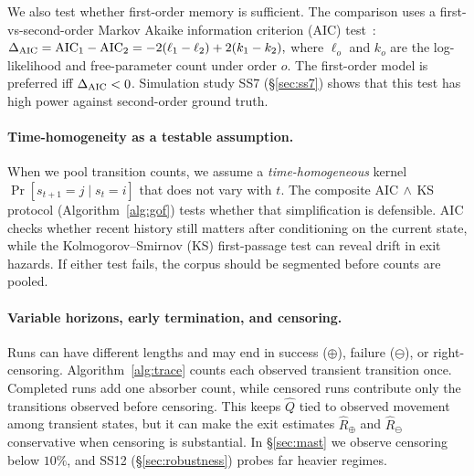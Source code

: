 We also test whether first-order memory is sufficient. The comparison
uses a first-vs-second-order Markov Akaike information criterion (AIC)
test~\cite{akaike1974}:
$\Delta_{\rm AIC} = \mathrm{AIC}_1 - \mathrm{AIC}_2
                  = -2(\ell_1 - \ell_2) + 2(k_1 - k_2),$
where $\ell_o$ and $k_o$ are the log-likelihood and free-parameter
count under order $o$. The first-order model is preferred iff
$\Delta_{\rm AIC} < 0$. Simulation study SS7 (\S\ref{sec:ss7}) shows
that this test has high power against second-order ground truth.

\paragraph{Time-homogeneity as a testable assumption.}
When we pool transition counts, we assume a \emph{time-homogeneous}
kernel $\Pr[s_{t+1}=j \mid s_t=i]$ that does not vary with $t$. The
composite AIC$\,\wedge\,$KS protocol (Algorithm~\ref{alg:gof}) tests
whether that simplification is defensible. AIC checks whether recent
history still matters after conditioning on the current state, while
the Kolmogorov--Smirnov (KS) first-passage test can reveal drift in
exit hazards. If either test fails, the corpus should be segmented
before counts are pooled.

\paragraph{Variable horizons, early termination, and censoring.}
Runs can have different lengths and may end in success ($\oplus$),
failure ($\ominus$), or right-censoring. Algorithm~\ref{alg:trace}
counts each observed transient transition once. Completed runs add one
absorber count, while censored runs contribute only the transitions
observed before censoring. This keeps $\hat Q$ tied to observed
movement among transient states, but it can make the exit estimates
$\hat R_\oplus$ and $\hat R_\ominus$ conservative when censoring is
substantial. In \S\ref{sec:mast} we observe censoring below $10\%$, and
SS12 (\S\ref{sec:robustness}) probes far heavier regimes.

